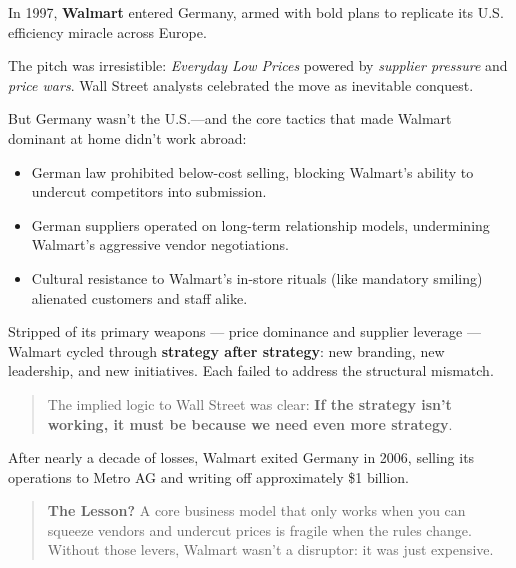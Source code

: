 \begin{tcolorbox}[colback=blue!5!white, colframe=blue!50!black, breakable,
  title={Historical Sidebar: When Strategy Eats Itself --- Walmart's German Collapse}]

In 1997, \textbf{Walmart} entered Germany, armed with bold plans to replicate its U.S. efficiency miracle across Europe.

\medskip

The pitch was irresistible: \textit{Everyday Low Prices} powered by \textit{supplier pressure} and \textit{price wars}. Wall Street analysts celebrated the move as inevitable conquest.

\medskip

But Germany wasn’t the U.S.—and the core tactics that made Walmart dominant at home didn’t work abroad:
\begin{itemize}
    \item German law prohibited below-cost selling, blocking Walmart’s ability to undercut competitors into submission.
    \item German suppliers operated on long-term relationship models, undermining Walmart’s aggressive vendor negotiations.
    \item Cultural resistance to Walmart’s in-store rituals (like mandatory smiling) alienated customers and staff alike.
\end{itemize}

\medskip

Stripped of its primary weapons --- price dominance and supplier leverage --- Walmart cycled through \textbf{strategy after strategy}: new branding, new leadership, and new initiatives. Each failed to address the structural mismatch.

\medskip

\begin{quote}
  The implied logic to Wall Street was clear: \textbf{If the strategy isn’t working, it must be because we need even more strategy}.
\end{quote}

\medskip

After nearly a decade of losses, Walmart exited Germany in 2006, selling its operations to Metro AG and writing off approximately \$1 billion.

\medskip

\begin{quote}
  \textbf{The Lesson?} A core business model that only works when you can squeeze vendors and undercut prices is fragile when the rules change. Without those levers, Walmart wasn’t a disruptor: it was just expensive.
\end{quote}

\end{tcolorbox}



